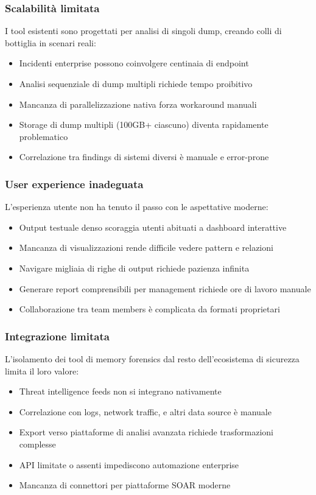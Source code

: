 \subsubsection{Scalabilità limitata}
I tool esistenti sono progettati per analisi di singoli dump, creando colli di bottiglia in scenari reali:
\begin{itemize}
    \item Incidenti enterprise possono coinvolgere centinaia di endpoint
    \item Analisi sequenziale di dump multipli richiede tempo proibitivo
    \item Mancanza di parallelizzazione nativa forza workaround manuali
    \item Storage di dump multipli (100GB+ ciascuno) diventa rapidamente problematico
    \item Correlazione tra findings di sistemi diversi è manuale e error-prone
\end{itemize}

\subsubsection{User experience inadeguata}
L'esperienza utente non ha tenuto il passo con le aspettative moderne:
\begin{itemize}
    \item Output testuale denso scoraggia utenti abituati a dashboard interattive
    \item Mancanza di visualizzazioni rende difficile vedere pattern e relazioni
    \item Navigare migliaia di righe di output richiede pazienza infinita
    \item Generare report comprensibili per management richiede ore di lavoro manuale
    \item Collaborazione tra team members è complicata da formati proprietari
\end{itemize}

\subsubsection{Integrazione limitata}
L'isolamento dei tool di memory forensics dal resto dell'ecosistema di sicurezza limita il loro valore:
\begin{itemize}
    \item Threat intelligence feeds non si integrano nativamente
    \item Correlazione con logs, network traffic, e altri data source è manuale
    \item Export verso piattaforme di analisi avanzata richiede trasformazioni complesse
    \item API limitate o assenti impediscono automazione enterprise
    \item Mancanza di connettori per piattaforme SOAR moderne
\end{itemize}

